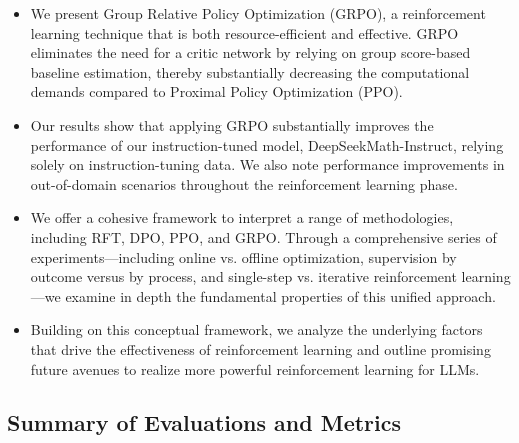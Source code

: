 \begin{itemize}[topsep=0pt]
    \item We present Group Relative Policy Optimization (GRPO), a reinforcement learning technique that is both resource-efficient and effective. GRPO eliminates the need for a critic network by relying on group score-based baseline estimation, thereby substantially decreasing the computational demands compared to Proximal Policy Optimization (PPO).
    \item Our results show that applying GRPO substantially improves the performance of our instruction-tuned model, DeepSeekMath-Instruct, relying solely on instruction-tuning data. We also note performance improvements in out-of-domain scenarios throughout the reinforcement learning phase.
    \item We offer a cohesive framework to interpret a range of methodologies, including RFT, DPO, PPO, and GRPO. Through a comprehensive series of experiments—including online vs. offline optimization, supervision by outcome versus by process, and single-step vs. iterative reinforcement learning—we examine in depth the fundamental properties of this unified approach.
    \item Building on this conceptual framework, we analyze the underlying factors that drive the effectiveness of reinforcement learning and outline promising future avenues to realize more powerful reinforcement learning for LLMs.
\end{itemize}

\subsection{Summary of Evaluations and Metrics}

